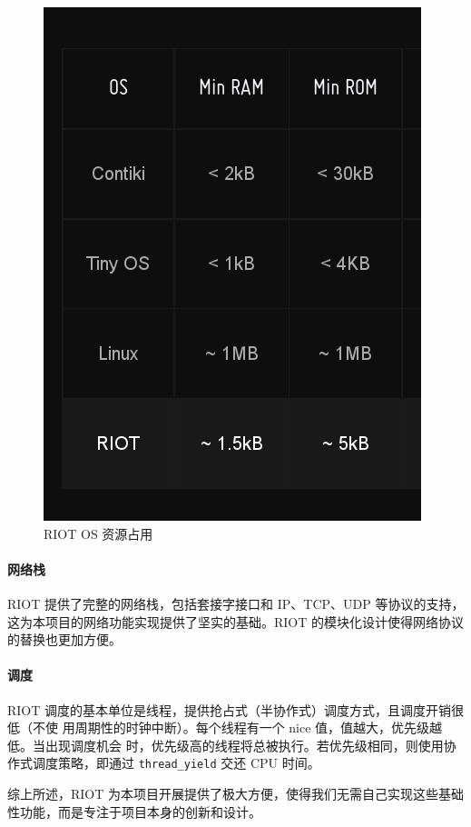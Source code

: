 \documentclass{ctexart}
\begin{document}
\begin{figure}
	\centering
	\includegraphics[scale=0.3]{RIOT-Resource.png}
	\caption{RIOT OS 资源占用}
	\label{RIOT-Resource}
\end{figure}


\paragraph{网络栈}
RIOT 提供了完整的网络栈，包括套接字接口和 IP、TCP、UDP 等协议的支持，这为本项目的网络功能实现提供了坚实的基础。RIOT 的模块化设计使得网络协议的替换也更加方便。

\paragraph{调度}
RIOT 调度的基本单位是线程，提供抢占式（半协作式）调度方式，且调度开销很低（不使
用周期性的时钟中断）。每个线程有一个 nice 值，值越大，优先级越低。当出现调度机会
时，优先级高的线程将总被执行。若优先级相同，则使用协作式调度策略，即通过
\verb|thread_yield| 交还 CPU 时间。

综上所述，RIOT 为本项目开展提供了极大方便，使得我们无需自己实现这些基础性功能，而是专注于项目本身的创新和设计。
\end{document}
